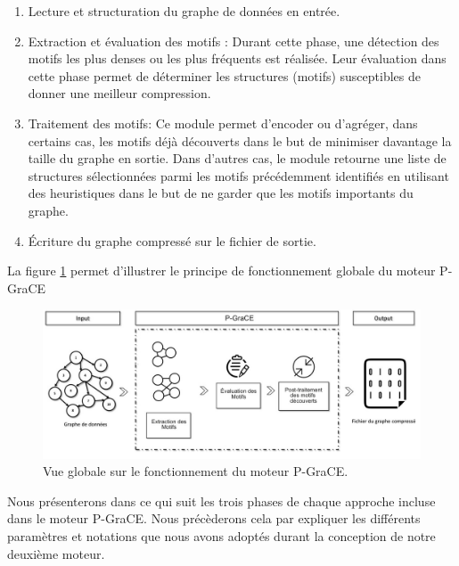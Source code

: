 \documentclass[a4paper,oneside,12pt]{report}
\theoremstyle{definition}
\begin{document}
\begin{enumerate}

\item Lecture et structuration du graphe de données en entrée. 

\item Extraction et évaluation des motifs : Durant cette phase, une détection des motifs les plus denses ou les plus fréquents est réalisée. Leur évaluation dans cette phase permet de déterminer les structures (motifs) susceptibles de donner une meilleur compression.

\item Traitement des motifs: Ce module permet d'encoder ou d'agréger, dans certains cas, les motifs déjà découverts dans le but de minimiser davantage la taille du graphe en sortie. Dans d'autres cas, le module retourne une liste de structures sélectionnées parmi les motifs précédemment identifiés en utilisant des heuristiques dans le but de ne garder que les motifs importants du graphe. 

\item Écriture du graphe compressé sur le fichier de sortie.
\end{enumerate}

La figure \ref{P_grace} permet d'illustrer le principe de fonctionnement globale du moteur \gls{P-GraCE}


\begin{figure}[H]
	\includegraphics[scale=0.48]{./ressources/image/pgrace.jpg}
	\caption[Vue globale sur le fonctionnement du moteur \gls{P-GraCE}.]{Vue globale sur le fonctionnement du moteur P-GraCE.}
	\label{P_grace}
\end{figure}

Nous présenterons dans ce qui suit les trois phases de chaque approche incluse  dans le moteur P-GraCE. Nous précèderons  cela par expliquer les différents paramètres et notations que nous avons adoptés durant la conception de notre deuxième moteur.
		
\end{document}

